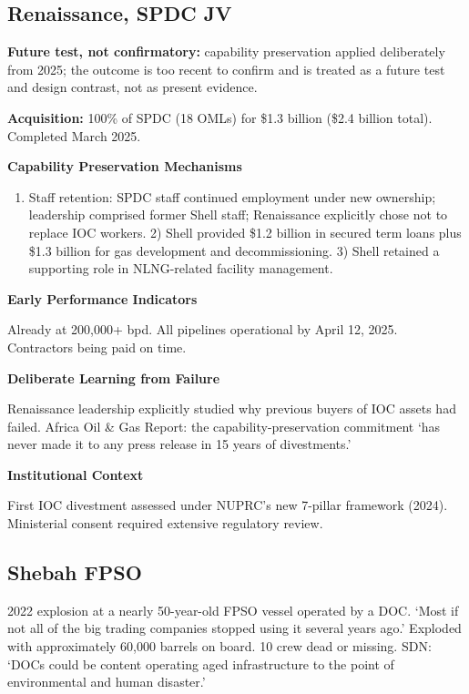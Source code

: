 \hypertarget{renaissance-spdc-jv}{%
\subsection{Renaissance, SPDC JV}\label{renaissance-spdc-jv}}

\textbf{Future test, not confirmatory:} capability preservation applied
deliberately from 2025; the outcome is too recent to confirm and is
treated as a future test and design contrast, not as present evidence.

\textbf{Acquisition:} 100\% of SPDC (18 OMLs) for \$1.3 billion (\$2.4
billion total). Completed March 2025.

\textbf{Capability Preservation Mechanisms}

\begin{enumerate}
\def\labelenumi{\arabic{enumi})}
\tightlist
\item
  Staff retention: SPDC staff continued employment under new ownership;
  leadership comprised former Shell staff; Renaissance explicitly chose
  not to replace IOC workers. 2) Shell provided \$1.2 billion in secured
  term loans plus \$1.3 billion for gas development and decommissioning.
  3) Shell retained a supporting role in NLNG-related facility
  management.
\end{enumerate}

\textbf{Early Performance Indicators}

Already at 200,000+ bpd. All pipelines operational by April 12, 2025.
Contractors being paid on time.

\textbf{Deliberate Learning from Failure}

Renaissance leadership explicitly studied why previous buyers of IOC
assets had failed. Africa Oil \& Gas Report: the capability-preservation
commitment `has never made it to any press release in 15 years of
divestments.'

\textbf{Institutional Context}

First IOC divestment assessed under NUPRC's new 7-pillar framework
(2024). Ministerial consent required extensive regulatory review.

\hypertarget{shebah-fpso}{%
\subsection{Shebah FPSO}\label{shebah-fpso}}

2022 explosion at a nearly 50-year-old FPSO vessel operated by a DOC.
`Most if not all of the big trading companies stopped using it several
years ago.' Exploded with approximately 60,000 barrels on board. 10 crew
dead or missing. SDN: `DOCs could be content operating aged
infrastructure to the point of environmental and human disaster.'

